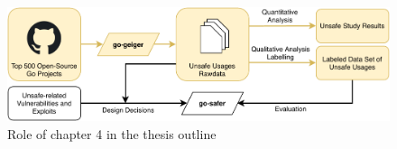 \begin{figure}[ht]
    \includegraphics[width=\textwidth]{assets/figures/chapter4/outline4.pdf}
    \caption{Role of chapter 4 in the thesis outline}
    \label{fig:outline4}
\end{figure}
